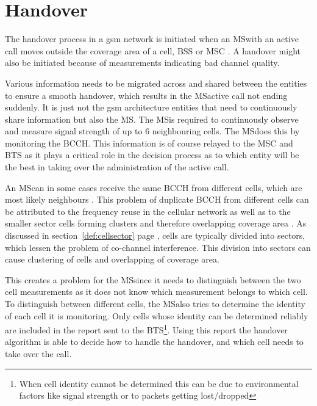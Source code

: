 \section{Handover}
\label{sec:handover}
The handover process in a \gls{gsm} network is initiated when an \gls{MS}with an active call moves outside the coverage area of a cell, BSS or MSC \cite{GSMArchitectureProtocolsServices,wirelesstelcoMullet,Eisenblatter}. A handover might also be initiated because of measurements indicating bad channel quality\cite{GSMArchitectureProtocolsServices}. 

Various information needs to be migrated across and shared between the entities to ensure a smooth handover, which results in the \gls{MS}active call not ending suddenly. It is just not the \gls{gsm} architecture entities that need to continuously share information but also the MS\@. The \gls{MS}is required to continuously observe and measure signal strength of up to 6 neighbouring cells. The \gls{MS}does this by monitoring the BCCH\cite{GSMArchitectureProtocolsServices,wirelesstelcoMullet}. This information is of course relayed to the MSC and BTS as it plays a critical role in the decision process as to which entity will be the best in taking over the administration of the active call\cite{GSMArchitectureProtocolsServices,wirelesstelcoMullet}.

An \gls{MS}can in some cases receive the same BCCH from different cells, which are most likely neighbours \cite{GSMArchitectureProtocolsServices}. This problem of duplicate BCCH from different cells can be attributed to the frequency reuse in the cellular network as well as to the smaller sector cells forming clusters and therefore overlapping coverage area \cite{GSMArchitectureProtocolsServices}. As discussed in section~\ref{def:cellsector} page \pageref{def:cellsector}, cells are typically divided into sectors, which lessen the problem of co-channel interference. This division into sectors can cause clustering of cells and overlapping of coverage area.

This creates a problem for the \gls{MS}since it needs to distinguish between the two cell measurements as it does not know which measurement belongs to which cell\cite{GSMArchitectureProtocolsServices}. To distinguish between different cells, the \gls{MS}also tries to determine the identity of each cell it is monitoring. Only cells whose identity can be determined reliably are included in the report sent to the BTS\cite{Eisenblatter,GSMArchitectureProtocolsServices,wirelesstelcoMullet}\footnote{When cell identity cannot be determined this can be due to environmental factors like signal strength or to packets getting lost/dropped}. Using this report the handover algorithm is able to decide how to handle the handover, and which cell needs to take over the call\cite{Eisenblatter,GSMArchitectureProtocolsServices,wirelesstelcoMullet}.

